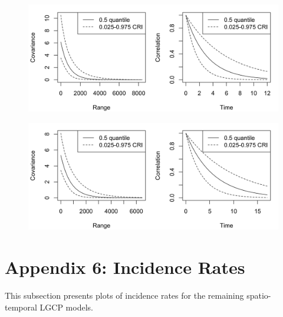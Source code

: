     \begin{figure}[H]
        \begin{center}
            \includegraphics[width=\linewidth]{Posterior Covariance Function - Major 2.png}
        \end{center}
    \end{figure}

    \begin{figure}[H]
        \begin{center}
            \includegraphics[width=\linewidth]{Posterior Covariance Function - Major 13456.png}
        \end{center}
    \end{figure}

    \newpage


\section*{Appendix 6: Incidence Rates} \label{app:incidence-rates}

    This subsection presents plots of incidence rates for the remaining spatio-temporal LGCP models.

